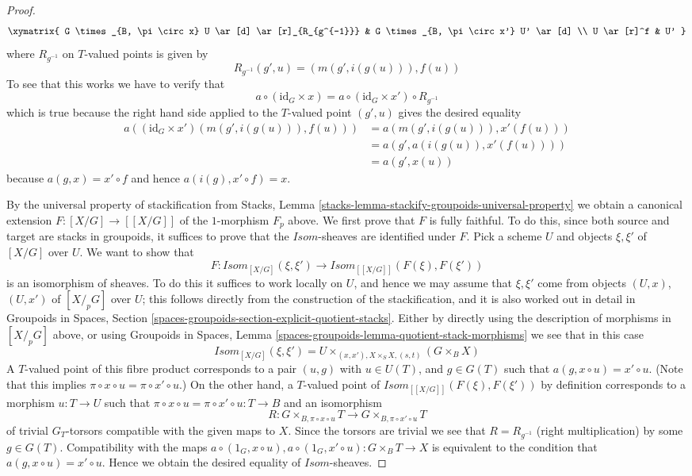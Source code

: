 \begin{proof}
$$
\xymatrix{
G \times_{B, \pi \circ x} U \ar[d] \ar[r]_{R_{g^{-1}}} &
G \times_{B, \pi \circ x'} U' \ar[d] \\
U \ar[r]^f & U'
}
$$
where $R_{g^{-1}}$ on $T$-valued points is given by
$$
R_{g^{-1}}(g', u) = (m(g', i(g(u))), f(u))
$$
To see that this works we have to verify that
$$
a \circ (\text{id}_G \times x)
=
a \circ (\text{id}_G \times x') \circ R_{g^{-1}}
$$
which is true because the right hand side applied to the $T$-valued point
$(g', u)$ gives the desired equality
\begin{align*}
a((\text{id}_G \times x')(m(g', i(g(u))), f(u)))
& =
a(m(g', i(g(u))), x'(f(u))) \\
& =
a(g', a(i(g(u)), x'(f(u)))) \\
& =
a(g', x(u))
\end{align*}
because $a(g, x) = x' \circ f$ and hence $a(i(g), x' \circ f) = x$.

\medskip\noindent
By the universal property of stackification from
Stacks, Lemma \ref{stacks-lemma-stackify-groupoids-universal-property}
we obtain a canonical extension $F : [X/G] \to [[X/G]]$ of the $1$-morphism
$F_p$ above. We first prove that $F$ is fully faithful.
To do this, since both source and target are stacks in groupoids,
it suffices to prove that the $\mathit{Isom}$-sheaves are identified
under $F$. Pick a scheme $U$ and objects $\xi, \xi'$ of
$[X/G]$ over $U$. We want to show that
$$
F :
\mathit{Isom}_{[X/G]}(\xi, \xi')
\longrightarrow
\mathit{Isom}_{[[X/G]]}(F(\xi), F(\xi'))
$$
is an isomorphism of sheaves. To do this it suffices to work locally
on $U$, and hence we may assume that $\xi, \xi'$ come from objects
$(U, x)$, $(U, x')$ of $[X/_{\!p}G]$ over $U$; this follows directly
from the construction of the stackification, and it is also worked
out in detail in
Groupoids in Spaces,
Section \ref{spaces-groupoids-section-explicit-quotient-stacks}.
Either by directly using the description of morphisms in
$[X/_{\!p}G]$ above, or using
Groupoids in Spaces,
Lemma \ref{spaces-groupoids-lemma-quotient-stack-morphisms}
we see that in this case
$$
\mathit{Isom}_{[X/G]}(\xi, \xi') =
U \times_{(x, x'), X \times_S X, (s, t)} (G \times_B X)
$$
A $T$-valued point of this fibre product corresponds to a pair
$(u, g)$ with $u \in U(T)$, and $g \in G(T)$ such that
$a(g, x \circ u) = x' \circ u$. (Note that this implies
$\pi \circ x \circ u = \pi \circ x' \circ u$.)
On the other hand, a $T$-valued
point of $\mathit{Isom}_{[[X/G]]}(F(\xi), F(\xi'))$ by definition
corresponds to a morphism $u : T \to U$ such that
$\pi \circ x \circ u = \pi \circ x' \circ u : T \to B$ and an isomorphism
$$
R :
G \times_{B, \pi \circ x \circ u} T
\longrightarrow
G \times_{B, \pi \circ x' \circ u} T
$$
of trivial $G_T$-torsors compatible with the given maps to $X$.
Since the torsors are trivial we see that $R = R_{g^{-1}}$
(right multiplication) by some $g \in G(T)$. Compatibility with the maps
$a \circ (1_G, x \circ u), a \circ (1_G, x' \circ u) : G \times_B T \to X$
is equivalent to the condition that $a(g, x \circ u) = x' \circ u$.
Hence we obtain the desired equality of $\mathit{Isom}$-sheaves.


\end{proof}

